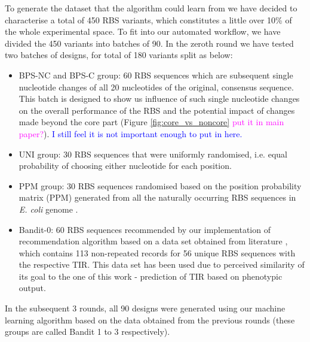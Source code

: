 \documentclass{article}
\newcommand{\mengyan}[1]{\textcolor{magenta}{#1}}
\newcommand{\maciej}[1]{\textcolor{blue}{#1}}
\begin{document}
To generate the dataset that the algorithm could learn from we have decided to characterise a total of 450 RBS variants, which constitutes a little over 10\% of the whole experimental space. 
To fit into our automated workflow, we have divided the 450 variants into batches of 90.
In the zeroth round we have tested two batches of designs, for total of 180 variants split as below: 
\begin{itemize}
    \item BPS-NC and BPS-C group: 60 RBS sequences which are subsequent single nucleotide changes of all 20 nucleotides of the original, consensus sequence. This batch is designed to show us influence of such single nucleotide changes on the overall performance of the RBS and the potential impact of changes made beyond the core part (Figure \ref{fig:core_vs_noncore} \mengyan{put it in main paper?}). \maciej{I still feel it is not important enough to put in here.}
    \item UNI group: 30 RBS sequences that were  uniformly randomised, i.e. equal probability of choosing either nucleotide for each position. 
    \item PPM group: 30 RBS sequences randomised based on the position probability matrix (PPM) generated from all the naturally occurring RBS sequences in \emph{E. coli} genome \cite{Stormo1982}.
    \item Bandit-0: 60 RBS sequences recommended by our implementation of recommendation algorithm based on a data set obtained from literature \cite{jervis2018machine}, which contains 113 non-repeated records for 56 unique RBS sequences with the respective TIR.
    This data set has been used due to perceived similarity of its goal to the one of this work - prediction of TIR based on phenotypic output.
\end{itemize}
In the subsequent 3 rounds, all 90 designs were generated using our machine learning algorithm based on the data obtained from the previous rounds (these groups are called Bandit 1 to 3 respectively).
\end{document}
